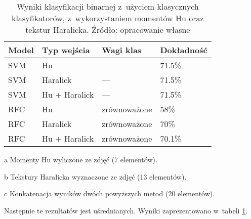 \begin{table}[!h]
	\centering
	\begin{threeparttable}
		\caption{Wyniki klasyfikacji binarnej z~użyciem klasycznych klasyfikatorów, z~wykorzystaniem momentów Hu oraz tekstur Haralicka. Źródło: opracowanie własne}
		\label{hu_haralick_table}
		\begin{tabularx}{1\textwidth}{ |X|X|X|X| }
		  \hline
		  \textbf{Model} & \textbf{Typ wejścia} & \textbf{Wagi klas} & \textbf{Dokładność}\\

		  \hline
		  SVM & Hu\tnote{a} & — & 71.5\%\\

		  \hline
		  SVM & Haralick\tnote{b} & — & 71.5\%\\

		  \hline
		  SVM & Hu + Haralick\tnote{c} & — & 71.5\%\\

		  \hline
		  RFC & Hu & zrównoważone & 58\%\\

		  \hline
  		  RFC & Haralick & zrównoważone & 70\%\\
  		  
		  \hline
  		  RFC & Hu + Haralick & zrównoważone & 70.1\%\\
  		  
		  \hline
		\end{tabularx}
		\begin{tablenotes}
			\footnotesize
			\item[a] Momenty Hu wyliczone ze zdjęć (7 elementów).
			\item[b] Tekstury Haralicka wyznaczone ze zdjęć (13 elementów).
			\item[c] Konkatenacja wyników dwóch powyższych metod (20 elementów).
		\end{tablenotes}
	\end{threeparttable}
\end{table}
 Następnie te  rezultatów jest uśrednianych. 
Wyniki zaprezentowano w~tabeli \ref{hu_haralick_table}.
